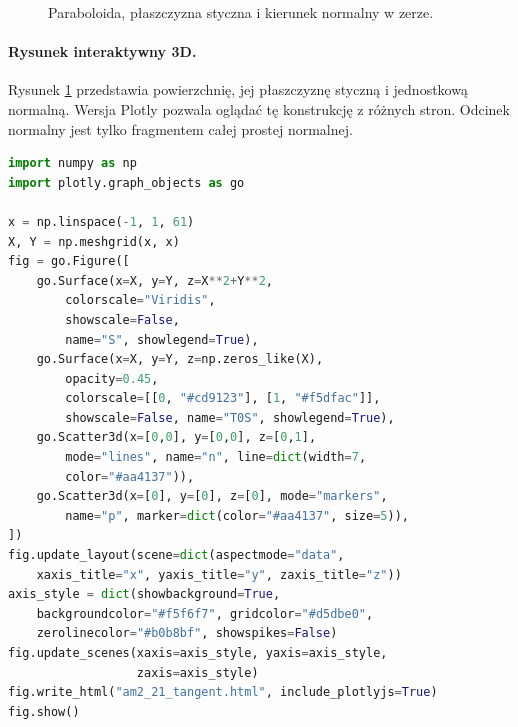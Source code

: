 \begin{figure}[htbp]
\centering
{}
\caption{Paraboloida, płaszczyzna styczna i kierunek normalny w zerze.}
\label{ma2:fig:submanifold-paraboloid}
\end{figure}

\paragraph{Rysunek interaktywny 3D.}
Rysunek \ref{ma2:fig:submanifold-paraboloid} przedstawia
powierzchnię, jej płaszczyznę styczną i jednostkową
normalną. Wersja Plotly pozwala oglądać tę konstrukcję
z różnych stron. Odcinek normalny jest tylko fragmentem
całej prostej normalnej.
\begin{lstlisting}[language=Python]
import numpy as np
import plotly.graph_objects as go

x = np.linspace(-1, 1, 61)
X, Y = np.meshgrid(x, x)
fig = go.Figure([
    go.Surface(x=X, y=Y, z=X**2+Y**2,
        colorscale="Viridis",
        showscale=False,
        name="S", showlegend=True),
    go.Surface(x=X, y=Y, z=np.zeros_like(X),
        opacity=0.45,
        colorscale=[[0, "#cd9123"], [1, "#f5dfac"]],
        showscale=False, name="T0S", showlegend=True),
    go.Scatter3d(x=[0,0], y=[0,0], z=[0,1],
        mode="lines", name="n", line=dict(width=7,
        color="#aa4137")),
    go.Scatter3d(x=[0], y=[0], z=[0], mode="markers",
        name="p", marker=dict(color="#aa4137", size=5)),
])
fig.update_layout(scene=dict(aspectmode="data",
    xaxis_title="x", yaxis_title="y", zaxis_title="z"))
axis_style = dict(showbackground=True,
    backgroundcolor="#f5f6f7", gridcolor="#d5dbe0",
    zerolinecolor="#b0b8bf", showspikes=False)
fig.update_scenes(xaxis=axis_style, yaxis=axis_style,
                  zaxis=axis_style)
fig.write_html("am2_21_tangent.html", include_plotlyjs=True)
fig.show()
\end{lstlisting}

